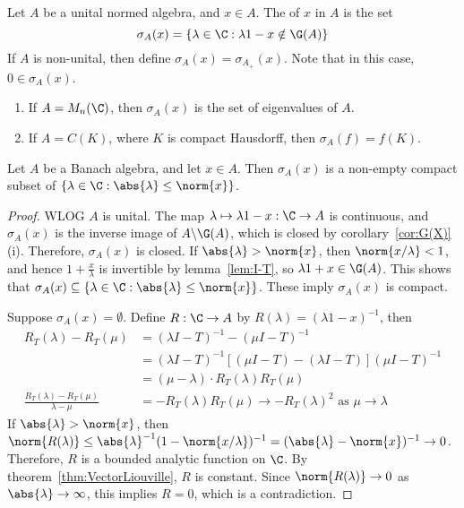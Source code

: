 \documentclass[a4paper]{article}
\begin{document}
Let $A$ be a unital normed algebra, and $x\in A$. The  of $x$ in $A$ is the set
\[
  \sigma_A(x)=\{\lambda\in\C:\lambda 1-x\notin\G(A)\}
\]
If $A$ is non-unital, then define $\sigma_A(x)=\sigma_{A_+}(x)$. Note that in this case, $0\in\sigma_A(x)$.

\begin{eg}
	\begin{enumerate}[label=(\arabic*)]
		\item If $A=M_n(\C)$, then $\sigma_A(x)$ is the set of eigenvalues of $A$.
		\item If $A=C(K)$, where $K$ is compact Hausdorff, then $\sigma_A(f)=f(K)$.
	\end{enumerate}
\end{eg}

\begin{nthm}\label{thm:Spectrum}
  Let $A$ be a Banach algebra, and let $x\in A$. Then $\sigma_A(x)$ is a non-empty compact subset of $\{\lambda\in\C:\abs{\lambda}\leq\norm{x}\}$.
\end{nthm}

\begin{proof}
  WLOG $A$ is unital. The map $\lambda\mapsto\lambda 1-x:\C\to A$ is continuous, and $\sigma_A(x)$ is the inverse image of $A\backslash\G(A)$, which is closed by corollary~\ref{cor:G(X)}(i). Therefore, $\sigma_A(x)$ is closed. If $\abs{\lambda}>\norm{x}$, then $\norm{x/\lambda}<1$, and hence $1+\frac{x}{\lambda}$ is invertible by lemma~\ref{lem:I-T}, so $\lambda 1+x\in\G(A)$. This shows that $\sigma_A(x)\subseteq\{\lambda\in\C:\abs{\lambda}\leq\norm{x}\}$. These imply $\sigma_A(x)$ is compact.

  Suppose $\sigma_A(x)=\emptyset$. Define $R:\C\to A$ by $R(\lambda)=(\lambda 1-x)^{-1}$, then
	\begin{align*}
		R_T(\lambda)-R_T(\mu)&=(\lambda I-T)^{-1}-(\mu I-T)^{-1}\\
		&=(\lambda I-T)^{-1}[(\mu I-T)-(\lambda I-T)](\mu I-T)^{-1}\\
		&=(\mu-\lambda)\cdot R_T(\lambda)R_T(\mu)\\
		\frac{R_T(\lambda)-R_T(\mu)}{\lambda-\mu}&=-R_T(\lambda)R_T(\mu)\to -R_T(\lambda)^2\text{ as }\mu\to\lambda
	\end{align*}
  If $\abs{\lambda}>\norm{x}$, then $\norm{R(\lambda)}\leq\abs{\lambda}^{-1}(1-\norm{x/\lambda})^{-1}=(\abs{\lambda}-\norm{x})^{-1}\to 0$. Therefore, $R$ is a bounded analytic function on $\C$. By theorem~\ref{thm:VectorLiouville}, $R$ is constant. Since $\norm{R(\lambda)}\to 0$ as $\abs{\lambda}\to\infty$, this implies $R=0$, which is a contradiction.
\end{proof}
\end{document}
